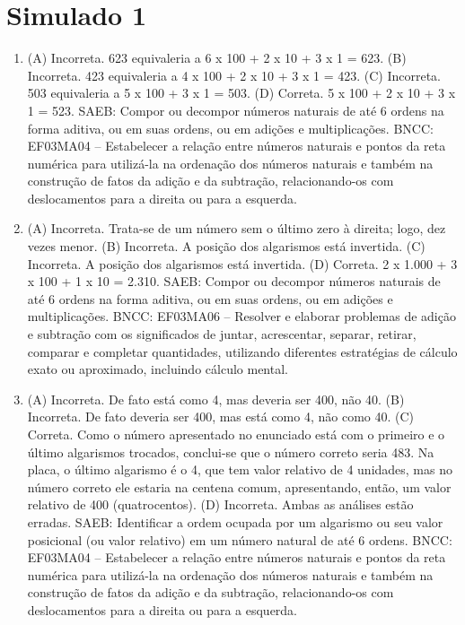 \section*{Simulado 1}

\begin{enumerate}
\item
(A) Incorreta. 623 equivaleria a 6 x 100 + 2 x 10 + 3 x 1 = 623.
(B) Incorreta. 423 equivaleria a 4 x 100 + 2 x 10 + 3 x 1 = 423.
(C) Incorreta. 503 equivaleria a 5 x 100 + 3 x 1 = 503.
(D) Correta. 5 x 100 + 2 x 10 + 3 x 1 = 523.
SAEB: Compor ou decompor números naturais de até 6 ordens na forma aditiva, ou em suas ordens, ou em adições e multiplicações.
BNCC: EF03MA04 -- Estabelecer a relação entre números naturais e pontos da reta numérica para
utilizá-la na ordenação dos números naturais e também na construção de fatos da adição e da
subtração, relacionando-os com deslocamentos para a direita ou para a esquerda.

\item
(A) Incorreta. Trata-se de um número sem o último zero à direita; logo, dez vezes menor.
(B) Incorreta. A posição dos algarismos está invertida.
(C) Incorreta. A posição dos algarismos está invertida.
(D) Correta. 2 x 1.000 + 3 x 100 + 1 x 10 = 2.310.
SAEB: Compor ou decompor números naturais de até 6 ordens na
forma aditiva, ou em suas ordens, ou em adições e multiplicações.
BNCC: EF03MA06 – Resolver e elaborar problemas de adição e subtração com os significados de
juntar, acrescentar, separar, retirar, comparar e completar quantidades, utilizando diferentes
estratégias de cálculo exato ou aproximado, incluindo cálculo mental.

\item
(A) Incorreta. De fato está como 4, mas deveria ser 400, não 40.
(B) Incorreta. De fato deveria ser 400, mas está como 4, não como 40.
(C) Correta. Como o número apresentado no enunciado está com o primeiro e o último
algarismos trocados, conclui-se que o número correto seria 483. Na placa,
o último algarismo é o 4, que tem valor relativo de 4 unidades, mas no
número correto ele estaria na centena comum, apresentando, então, um valor
relativo de 400 (quatrocentos).
(D) Incorreta. Ambas as análises estão erradas.
SAEB: Identificar a ordem ocupada por um algarismo ou seu
valor posicional (ou valor relativo) em um número natural de até 6
ordens.
BNCC: EF03MA04 -- Estabelecer a relação entre números naturais e pontos da reta numérica para
utilizá-la na ordenação dos números naturais e também na construção de fatos da adição e da
subtração, relacionando-os com deslocamentos para a direita ou para a esquerda.


\end{enumerate}
